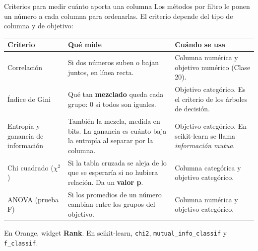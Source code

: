\documentclass[aspectratio=169,11pt]{beamer}
\begin{document}
\begin{frame}[t]{Criterios para medir cuánto aporta una columna}
  \small
  Los métodos por filtro le ponen un número a cada columna para ordenarlas.
  El criterio depende del tipo de columna y de objetivo:

  \footnotesize
  \renewcommand{\arraystretch}{1.12}
  \begin{tabular}{@{}L{3.0cm}L{5.4cm}L{4.7cm}@{}}
    \toprule
    \textbf{Criterio} & \textbf{Qué mide} & \textbf{Cuándo se usa} \\
    \midrule
    Correlación & Si dos números suben o bajan juntos, en línea recta. & Columna numérica y objetivo numérico (Clase 20). \\
    Índice de Gini & Qué tan \textbf{mezclado} queda cada grupo: 0 si todos son iguales. & Objetivo categórico. Es el criterio de los árboles de decisión. \\
    Entropía y ganancia de información & También la mezcla, medida en bits. La ganancia es cuánto baja la entropía al separar por la columna. & Objetivo categórico. En scikit-learn se llama \textit{información mutua}. \\
    Chi cuadrado ($\chi^2$) & Si la tabla cruzada se aleja de lo que se esperaría si no hubiera relación. Da un \textbf{valor p}. & Columna categórica y objetivo categórico. \\
    ANOVA (prueba F) & Si los promedios de un número cambian entre los grupos del objetivo. & Columna numérica y objetivo categórico. \\
    \bottomrule
  \end{tabular}
  \vspace{0.05cm}

  \scriptsize En Orange, widget \textbf{Rank}. En scikit-learn,
  \texttt{chi2}, \texttt{mutual\_info\_classif} y \texttt{f\_classif}.
\end{frame}

\end{document}
